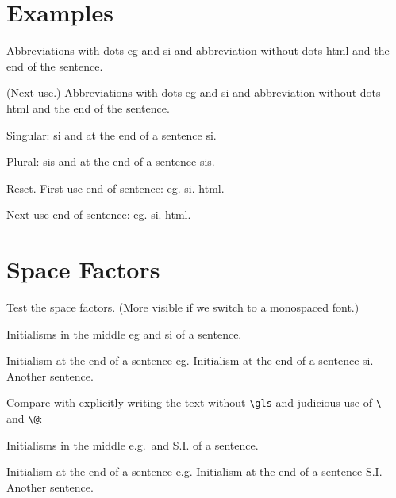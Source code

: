 \documentclass{article}
\begin{document}
\section{Examples}

Abbreviations with dots \gls{eg} and \gls{si} and abbreviation
without dots \gls{html} and the end of the sentence. 

(Next use.) Abbreviations with dots \gls{eg} and \gls{si} and abbreviation
without dots \gls{html} and the end of the sentence. 

Singular: \gls{si} and at the end of a sentence \gls{si}.

Plural: \glspl{si} and at the end of a sentence \glspl{si}.

Reset\glsresetall. First use end of sentence:
\gls{eg}. \gls{si}. \gls{html}.

Next use end of sentence:
\gls{eg}. \gls{si}. \gls{html}.

\section{Space Factors}

Test the space factors. (More visible if we switch to a monospaced
font.)

\begin{ttfamily}
Initialisms in the middle \gls{eg} and \gls{si} of a sentence.

Initialism at the end of a sentence \gls{eg}.
Initialism at the end of a sentence \gls{si}.
Another sentence.
\end{ttfamily}

Compare with explicitly writing the text without \verb|\gls|
and judicious use of \verb*|\ | and \verb|\@|:

\begin{ttfamily}
Initialisms in the middle e.g.\ and S.I. of a sentence.

Initialism at the end of a sentence e.g.
Initialism at the end of a sentence S.I\@.
Another sentence.
\end{ttfamily}

\printglossaries
\end{document}

